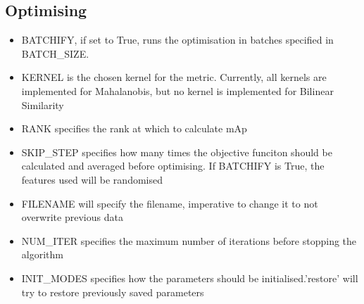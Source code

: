 \documentclass[10pt,technote]{IEEEtran}
\begin{document}
\subsection{Optimising}
\begin{itemize}
    \item BATCHIFY, if set to True, runs the optimisation in batches specified in BATCH\_SIZE.
    \item KERNEL is the chosen kernel for the metric. Currently, all kernels are implemented for Mahalanobis, but no kernel is implemented for Bilinear Similarity
    \item RANK specifies the rank at which to calculate mAp
    \item SKIP\_STEP specifies how many times the objective funciton should be calculated and averaged before optimising. If BATCHIFY is True, the features used will be randomised
    \item FILENAME will specify the filename, imperative to change it to not overwrite previous data
    \item NUM\_ITER specifies the maximum number of iterations before stopping the algorithm
    \item INIT\_MODES specifies how the parameters should be initialised.'restore' will try to restore previously saved parameters
\end{itemize}





\end{document}

